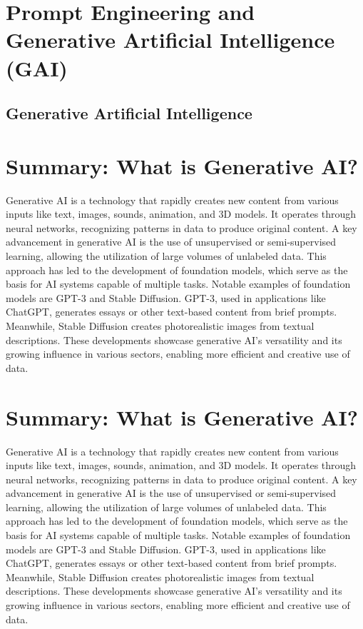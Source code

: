 \section*{Prompt Engineering and Generative Artificial Intelligence (GAI)}

\subsection{Generative Artificial Intelligence}


\section*{Summary: What is Generative AI?}

Generative AI is a technology that rapidly creates new content from various inputs like text, images, sounds, animation, and 3D models. It operates through neural networks, recognizing patterns in data to produce original content. A key advancement in generative AI is the use of unsupervised or semi-supervised learning, allowing the utilization of large volumes of unlabeled data. This approach has led to the development of foundation models, which serve as the basis for AI systems capable of multiple tasks. Notable examples of foundation models are GPT-3 and Stable Diffusion. GPT-3, used in applications like ChatGPT, generates essays or other text-based content from brief prompts. Meanwhile, Stable Diffusion creates photorealistic images from textual descriptions. These developments showcase generative AI's versatility and its growing influence in various sectors, enabling more efficient and creative use of data.



\section*{Summary: What is Generative AI?}

Generative AI is a technology that rapidly creates new content from various inputs like text, images, sounds, animation, and 3D models. It operates through neural networks, recognizing patterns in data to produce original content. A key advancement in generative AI is the use of unsupervised or semi-supervised learning, allowing the utilization of large volumes of unlabeled data. This approach has led to the development of foundation models, which serve as the basis for AI systems capable of multiple tasks. Notable examples of foundation models are GPT-3 and Stable Diffusion. GPT-3, used in applications like ChatGPT, generates essays or other text-based content from brief prompts. Meanwhile, Stable Diffusion creates photorealistic images from textual descriptions. These developments showcase generative AI's versatility and its growing influence in various sectors, enabling more efficient and creative use of data.



